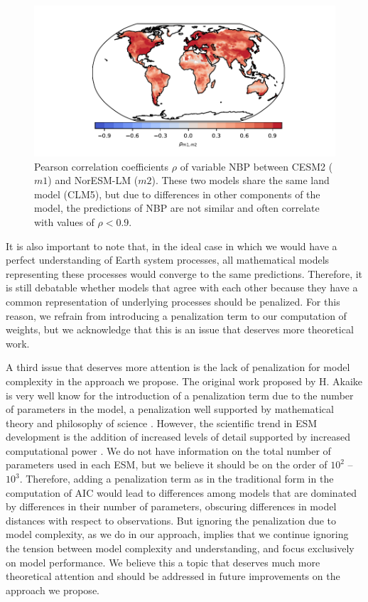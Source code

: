 \documentclass[gmd, manuscript]{copernicus}
\begin{document}
\begin{figure}[t]
   \centering
   \includegraphics[width=14cm]{Figures/Corr_CESM_NorESM.pdf} %
   \caption{Pearson correlation coefficients $\rho$ of variable NBP between CESM2 ($m1$) and NorESM-LM ($m2$). These two models share the same land model (CLM5), but due to differences in other components of the model, the predictions of NBP are not similar and often correlate with values of $\rho < 0.9$.}
   \label{fig:corr}
\end{figure}


It is also important to note that, in the ideal case in which we would have a perfect understanding of Earth system processes, all mathematical models representing these processes would converge to the same predictions. Therefore, it is still debatable whether models that agree with each other because they have a common representation of underlying processes should be penalized. For this reason, we refrain from introducing a penalization term to our computation of weights, but we acknowledge that this is an issue that deserves more theoretical work. 

A third issue that deserves more attention is the lack of penalization for model complexity in the approach we propose. The original work proposed by H. Akaike is very well know for the introduction of a penalization term due to the number of parameters in the model, a penalization well supported by mathematical theory and philosophy of science \citep{Akaike1974, Akaike1981}. However, the scientific trend in ESM development is the addition of increased levels of detail supported by increased computational power \citep{Held2005, Held2014}. We do not have information on the total number of parameters used in each ESM, but we believe it should be on the order of $10^2$ -- $10^3$. Therefore, adding a penalization term as in the traditional form in the computation of AIC would lead to differences among models that are dominated by differences in their number of parameters, obscuring differences in model distances with respect to observations. But ignoring the penalization due to model complexity, as we do in our approach, implies that we continue ignoring the tension between model complexity and understanding, and focus exclusively on model performance. We believe this a topic that deserves much more theoretical attention and should be addressed in future improvements on the approach we propose. 
\end{document}
